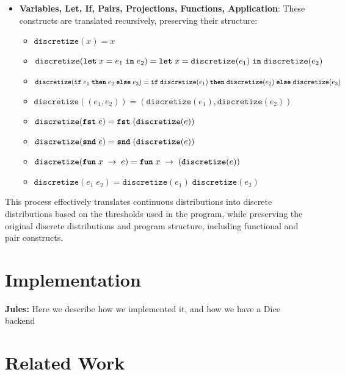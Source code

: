 \documentclass[acmsmall,screen,dvipsnames,x11names,nonacm,anonymous,review]{acmart}
\newcommand{\jules}[1]{{\color{blue}\textbf{Jules:} #1}}
\newcommand{\letkw}{\text{\ttfamily\bfseries let}}
\newcommand{\inkw}{\text{\ttfamily\bfseries in}}
\newcommand{\ifkw}{\text{\ttfamily\bfseries if}}
\newcommand{\thenkw}{\text{\ttfamily\bfseries then}}
\newcommand{\elsekw}{\text{\ttfamily\bfseries else}}
\newcommand{\fstkw}{\text{\ttfamily\bfseries fst}}
\newcommand{\sndkw}{\text{\ttfamily\bfseries snd}}
\newcommand{\funkw}{\text{\ttfamily\bfseries fun}}
\begin{document}
\begin{itemize}
    \item \textbf{Variables, Let, If, Pairs, Projections, Functions, Application}: These constructs are translated recursively, preserving their structure:
    \begin{itemize}
        \item $\texttt{discretize}(x) = x$
        \item $\texttt{discretize}(\letkw \; x = e_1 \; \inkw \; e_2) = \letkw \; x = \texttt{discretize}(e_1) \; \inkw \; \texttt{discretize}(e_2)$
        \item $\texttt{discretize}(\ifkw \; e_1 \; \thenkw \; e_2 \; \elsekw \; e_3) = \ifkw \; \texttt{discretize}(e_1) \; \thenkw \; \texttt{discretize}(e_2) \; \elsekw \; \texttt{discretize}(e_3)$
        \item $\texttt{discretize}((e_1, e_2)) = (\texttt{discretize}(e_1), \texttt{discretize}(e_2))$
        \item $\texttt{discretize}(\fstkw \; e) = \fstkw \; (\texttt{discretize}(e))$
        \item $\texttt{discretize}(\sndkw \; e) = \sndkw \; (\texttt{discretize}(e))$
        \item $\texttt{discretize}(\funkw \; x \; \rightarrow \; e) = \funkw \; x \; \rightarrow \; (\texttt{discretize}(e))$
        \item $\texttt{discretize}(e_1 \; e_2) = \texttt{discretize}(e_1) \; \texttt{discretize}(e_2)$
    \end{itemize}
\end{itemize}

This process effectively translates continuous distributions into discrete distributions based on the thresholds used in the program, while preserving the original discrete distributions and program structure, including functional and pair constructs.

\section{Implementation}

\jules{Here we describe how we implemented it, and how we have a Dice backend}

\section{Related Work}
\label{sec:related}
\end{document}
